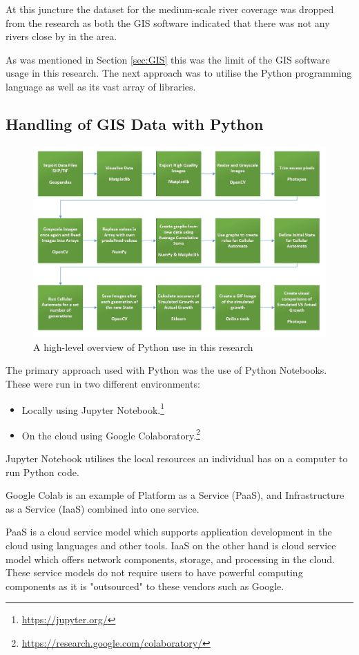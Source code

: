 At this juncture the dataset for the medium-scale river coverage was dropped from the research as both the GIS software indicated that there was not any rivers close by  in the area.

As was mentioned in Section \ref{sec:GIS} this was the limit of the GIS software usage in this research. The next approach was to utilise the Python programming language as well as its vast array of libraries.
\subsection{Handling of GIS Data with Python}
\begin{figure}[H]
\centering
\includegraphics[width=1\textwidth]{Figures/Chapter3/Overview}
\caption{A high-level overview of Python use in this research}
\end{figure}
The primary approach used with Python was the use of Python Notebooks. These were run in two different environments:
\begin{itemize}
\item Locally using Jupyter Notebook.\footnote{\url{https://jupyter.org/}}
\item On the cloud using Google Colaboratory.\footnote{\url{https://research.google.com/colaboratory/}}
\end{itemize}
Jupyter Notebook utilises the local resources an individual has on a computer to run Python code.

Google Colab is an example of Platform as a Service (PaaS), and Infrastructure as a Service (IaaS) combined into one service.

PaaS is a cloud service model which supports application development in the cloud using languages and other tools. IaaS on the other hand is cloud service model which offers network components, storage, and processing in the cloud.\cite{pf} These service models do not require users to have powerful computing components as it is "outsourced" to these vendors such as Google.


